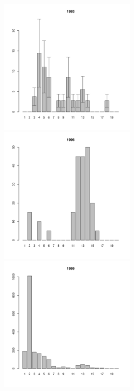 \documentclass[12pt, a4paper]{article}
\begin{document}
\begin{figure}[h]
\begin{multicols}{3}
\end{multicols}



\begin{multicols}{3}
\hfill
\includegraphics[width=65mm]{../White_Sea/Luvenga_Goreliy/low_1993_.pdf}
\hfill
\includegraphics[width=65mm]{../White_Sea/Luvenga_Goreliy/low_1996_.pdf}
\hfill
\includegraphics[width=65mm]{../White_Sea/Luvenga_Goreliy/low_1999_.pdf}

\end{multicols}



\end{figure}
\end{document}
